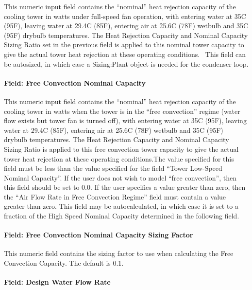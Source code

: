 This numeric input field contains the ``nominal'' heat rejection capacity of the cooling tower in watts under full-speed fan operation, with entering water at 35C (95F), leaving water at 29.4C (85F), entering air at 25.6C (78F) wetbulb and 35C (95F) drybulb temperatures. The Heat Rejection Capacity and Nominal Capacity Sizing Ratio set in the previous field is applied to this nominal tower capacity to give the actual tower heat rejection at these operating conditions.~ This field can be autosized, in which case a Sizing:Plant object is needed for the condenser loop.

\paragraph{Field: Free Convection Nominal Capacity}\label{field-free-convection-nominal-capacity}

This numeric input field contains the ``nominal'' heat rejection capacity of the cooling tower in watts when the tower is in the ``free convection'' regime (water flow exists but tower fan is turned off), with entering water at 35C (95F), leaving water at 29.4C (85F), entering air at 25.6C (78F) wetbulb and 35C (95F) drybulb temperatures. The Heat Rejection Capacity and Nominal Capacity Sizing Ratio is applied to this free convection tower capacity to give the actual tower heat rejection at these operating conditions.The value specified for this field must be less than the value specified for the field ``Tower Low-Speed Nominal Capacity''. If the user does not wish to model ``free convection'', then this field should be set to 0.0. If the user specifies a value greater than zero, then the ``Air Flow Rate in Free Convection Regime'' field must contain a value greater than zero. This field may be autocalculated, in which case it is set to a fraction of the High Speed Nominal Capacity determined in the following field.

\paragraph{Field: Free Convection Nominal Capacity Sizing Factor}\label{field-free-convection-nominal-capacity-sizing-factor-2}

This numeric field contains the sizing factor to use when calculating the Free Convection Capacity. The default is 0.1.

\paragraph{Field: Design Water Flow Rate}\label{field-design-water-flow-rate-2}


